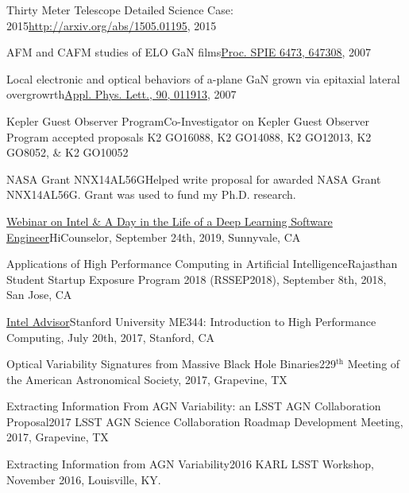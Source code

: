\documentclass[10pt,a4paper]{article}
\begin{document}
\inlineheadsection
 {Thirty Meter Telescope Detailed Science Case: 2015}{\href{http://arxiv.org/abs/1505.01195}{http://arxiv.org/abs/1505.01195}, 2015}

\inlineheadsection
  {AFM and CAFM studies of ELO GaN films}{\href{http://dx.doi.org/10.1117/12.706773}{Proc. SPIE 6473, 647308}, 2007}

\inlineheadsection
  {Local electronic and optical behaviors of a-plane GaN grown via epitaxial lateral overgrowrth}{\href{http://dx.doi.org/10.1063/1.2429901}{Appl. Phys. Lett., 90, 011913}, 2007}


\spacedhrule{2.0em}{0.2em}


\inlineheadsection
  {Kepler Guest Observer Program}{Co-Investigator on Kepler Guest Observer Program accepted proposals K2 GO16088, K2 GO14088, K2 GO12013, K2 GO8052, \& K2 GO10052}

\inlineheadsection
  {NASA Grant NNX14AL56G}{Helped write proposal for awarded NASA Grant NNX14AL56G. Grant was used to fund my Ph.D. research.}

\spacedhrule{2.0em}{0.2em}


\inlineheadsection
  {\href{https://www.youtube.com/watch?v=lVLn9am93Qs}{Webinar on Intel \& A Day in the Life of a Deep Learning Software Engineer}}{HiCounselor, September 24th, 2019, Sunnyvale, CA}

\inlineheadsection
  {Applications of High Performance Computing in Artificial Intelligence}{Rajasthan Student Startup Exposure Program 2018 (RSSEP2018), September 8th, 2018, San Jose, CA}

\inlineheadsection
  {\href{https://software.intel.com/en-us/advisor}{Intel Advisor}}{Stanford University ME344: Introduction to High Performance Computing, July 20th, 2017, Stanford, CA}

\inlineheadsection
  {Optical Variability Signatures from Massive Black Hole Binaries}{229$^{\mathrm{th}}$ Meeting of the American Astronomical Society, 2017, Grapevine, TX}

\inlineheadsection
  {Extracting Information From AGN Variability: an LSST AGN Collaboration Proposal}{2017 LSST AGN Science Collaboration Roadmap Development Meeting, 2017, Grapevine, TX}

\inlineheadsection
  {Extracting Information from AGN Variability}{2016 KARL LSST Workshop, November 2016, Louisville, KY.}
\end{document}
